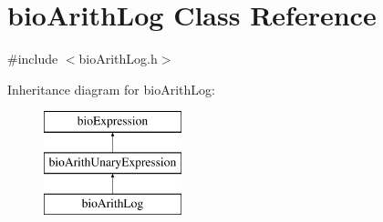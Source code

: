 \hypertarget{classbio_arith_log}{}\section{bio\+Arith\+Log Class Reference}
\label{classbio_arith_log}


{\ttfamily \#include $<$bio\+Arith\+Log.\+h$>$}

Inheritance diagram for bio\+Arith\+Log\+:\begin{figure}[H]
\begin{center}
\leavevmode
\includegraphics[height=3.000000cm]{classbio_arith_log}
\end{center}
\end{figure}
